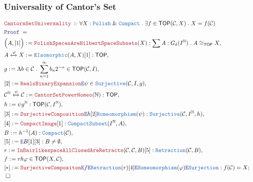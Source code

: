 \documentclass[12pt]{scrartcl}
\newcommand{\TYPE}[1]{\textcolor{NavyBlue}{\mathtt{#1}}}
\newcommand{\LOGIC}[1]{\textcolor{Blue}{\mathtt{#1}}}
\newcommand{\THM}[1]{\textcolor{Maroon}{\mathtt{#1}}}
\renewcommand{\.}{\; . \;}
\newcommand{\de}{: \kern 0.1pc =}
\newcommand{\Theorem}[2]{& \THM{#1} \, :: \, #2 \\ & \Proof = \\ }
\newcommand{\Page}[1]{ \begin{align*} #1 \end{align*}   }
\renewcommand{\And}{\; \& \;}
\newcommand{\Elim}{\LOGIC{E}}
\newcommand{\Nat}{\mathbb{N} }
\newcommand{\ToIso}{\xleftrightarrow}
\newcommand{\Say}[3]{& #1 \de #2 : #3, \\}
\newcommand{\SayIn}[3]{& #1 \de #2 \in #3, \\}
\newcommand{\Conclude}[3]{& #1 \de #2 : #3; \\}
\newcommand{\QED}{\; \square}
\newcommand{\EndProof}{& \QED \\}
\newcommand{\Proof}{\LOGIC{Proof} \; }
\newcommand{\C}{\mathcal{C}}
\newcommand{\Compact}{\TYPE{Compact}}
\newcommand{\Compacts}{\TYPE{CompactSubset}}
\newcommand{\TOP}{\mathsf{TOP}}
\newcommand{\Polish}{\TYPE{Polish}}
\begin{document}
\subsubsection{Universality of Cantor's Set}
\Page{
	\Theorem{CantorsSetUniversality}
	{
		\forall X : \Polish \And \Compact \.
		\exists f \in \TOP(\C,X) \.
		X = f(\C)
	}
	\Say{\Big(A,[1]\Big)}
	{
		\THM{PolishSpacesAreHilbertSpaceSubsets}(X)
	}
	{
		\sum A : G_\delta(I^\Nat) \.
		A \cong_\TOP X
	}
	\Say{A \ToIso{\varphi} X}
	{
		\Elim \TYPE{Isomorphic}(A,X)[1] 
	}
	{
		\TOP
	}
	\SayIn{g}{\Lambda b \in \C \. \sum^\infty_{n=1} b_n 2^{-n}}
	{
		\TOP(\C,I)
	}
	\SayIn{[2]}{\THM{RealsBinaryExpansion}\Elim \psi}{\TYPE{Surjective}(\C,I,g)}
	\Say{\C^\Nat \ToIso{\psi} \C}{\THM{CantorSetPowerHomeo}(\Nat)}
	{
		\TOP
	}
	\Say{h}{\psi g^\Nat}{\TOP(\C,I^\Nat)}
	\Say{[3]}{\THM{SurjectiveComposition}\Elim h[2]\TYPE{Homeomorphism}(\psi)}{\TYPE{Surjective}(\C,I^\Nat,h)}
	\Say{[4]}{\THM{CompactImage}[1]}{\Compacts(I^\Nat,A)}
	\Say{B}{h^{-1}(A)}{\TYPE{Compact}(\C)}
	\Say{[5]}{\Elim B [1][3]}{B \neq \emptyset}
	\Say{r}{\THM{InBairlikespaceAllClosedAreRetracts}(\C,\C,B)[5]}{\TYPE{Retraction}(\C,B)}
	\SayIn{f}{rh\varphi}{\TOP(X,\C)}
	\Conclude{[*]}{
		\THM{SurjectiveCompositon}
		\Elim f 
		\Elim \TYPE{Retraction}(r)[4]
		\Elim \TYPE{Homeomorphism}(\varphi)
		\Elim \TYPE{Surjection}
	}
	{
		f(\C) = X
	}
	\EndProof
}
\newpage
\end{document}

